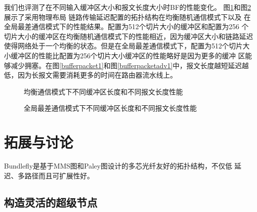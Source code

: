   我们也评测了在不同输入缓冲区大小和报文长度大小时BF的性能变化。
  图\ref{bufferpacket}和图\ref{bufferpacketadv}展示了采用物理布局
  链路传输延迟配置的拓扑结构在均衡随机通信模式下以及
  在全局最差通信模式下的性能结果。配置为512个切片大小的缓冲区和配置为256 个切片大小的缓冲区在均衡随机通信模式下的性能相近，因为缓冲区大小和链路延迟使得网络处于一个均衡的状态。但是在全局最差通信模式下，配置为512个切片大小缓冲区的性能比配置为256个切片大小缓冲区的性能略好是因为更多的缓冲
  区能够减少拥塞。在图\ref{bufferpacket1}和图\ref{bufferpacketadv1}中，报文长度越短延迟越低，因为长报文需要消耗更多的时间在路由器流水线上。


     \begin{figure}[t]
\setlength{\belowcaptionskip}{-.5cm}%
  \centering
 \begin{minipage}[t]{\textwidth}
   \centering
  \vspace{-.3cm}
  \caption{均衡通信模式下不同缓冲区长度和不同报文长度性能}
  \label{bufferpacket}
  \end{minipage}
  \end{figure}

 \begin{figure}[t]
\setlength{\belowcaptionskip}{-.5cm}%
  \centering
 \begin{minipage}[t]{\textwidth}
   \centering
  \vspace{-.3cm}
  \caption{全局最差通信模式下不同缓冲区长度和不同报文长度性能}
  \label{bufferpacketadv}
  \end{minipage}
  \end{figure}

    \section{拓展与讨论}
   Bundlefly是基于MMS图和Paley图设计的多芯光纤友好的拓扑结构，不仅低
   延迟、多路径而且可扩展性好。

   \subsection{构造灵活的超级节点}

